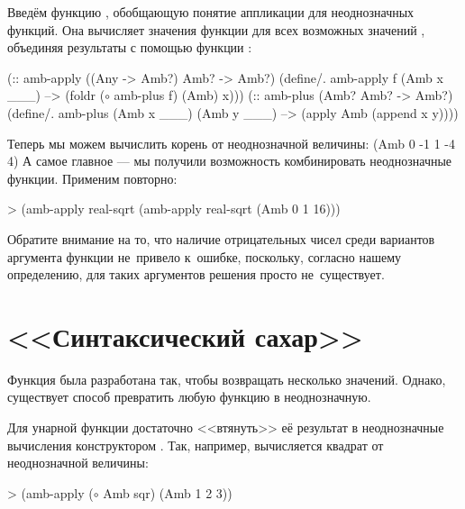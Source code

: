 Введём функцию , обобщающую понятие аппликации для неоднозначных функций. Она вычисляет значения функции  для всех возможных значений , объединяя результаты с помощью функции :
\begin{Definition}[emph={x,f}]
(:: amb-apply ((Any -> Amb?) Amb? -> Amb?)
  (define/. amb-apply
    f (Amb x ___) --> (foldr ($\circ$ amb-plus f) (Amb) x)))%
(:: amb-plus (Amb? Amb? -> Amb?)
  (define/. amb-plus
    (Amb x ___) (Amb y ___) --> (apply Amb (append x y))))
\end{Definition}

\newpage\noindent
Теперь мы можем вычислить корень от неоднозначной \mbox{величины:}\smallskip
{}
     {(Amb 0 -1 1 -4 4)}
\noindent А самое главное --- мы получили возможность комбинировать неоднозначные функции. Применим  повторно:
\begin{SchemeCode}
  > (amb-apply real-sqrt 
               (amb-apply real-sqrt (Amb 0 1 16)))
\end{SchemeCode}\vspace{-\smallskipamount}
Обратите внимание на то, что наличие отрицательных чисел среди вариантов аргумента функции  не~привело к~ошибке, поскольку, согласно нашему определению, для таких аргументов решения просто не~существует.

\section{<<Синтаксический сахар>>}%
Функция  была разработана так, чтобы возвращать несколько значений. Однако, существует способ превратить любую функцию в неоднозначную. 

Для унарной функции достаточно <<втянуть>> её результат в неоднозначные вычисления конструктором . Так, например, вычисляется квадрат от неоднозначной величины:
\begin{SchemeCode}
   > (amb-apply ($\circ$ Amb sqr) (Amb 1 2 3))
\end{SchemeCode}\vspace{-\medskipamount}

